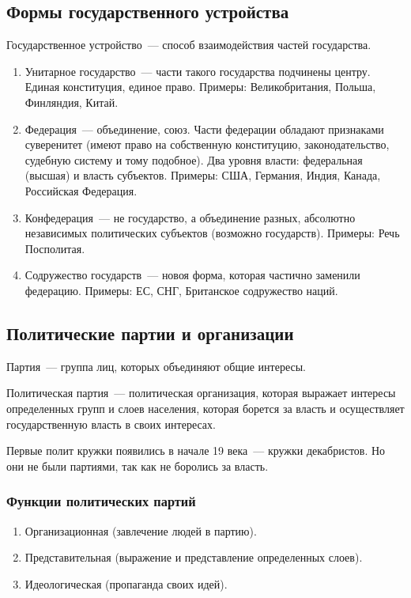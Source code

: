\documentclass[12pt]{article}
\begin{document}
	\subsection{Формы государственного устройства}
	\begin{definition}
		Государственное устройство~--- способ взаимодействия частей государства.
	\end{definition}
	\begin{enumerate}
		\item Унитарное государство~--- части такого государства подчинены центру. Единая конституция, единое право. Примеры: Великобритания, Польша, Финляндия, Китай.
		\item Федерация~--- объединение, союз. Части федерации обладают признаками суверенитет (имеют право на собственную конституцию, законодательство, судебную систему и тому подобное). Два уровня власти: федеральная (высшая) и власть субъектов. Примеры: США, Германия, Индия, Канада, Российская Федерация.
		\item Конфедерация~--- не государство, а объединение разных, абсолютно независимых политических субъектов (возможно государств). Примеры: Речь Посполитая.
		\item Содружество государств~--- новоя форма, которая частично заменили федерацию. Примеры: ЕС, СНГ, Британское содружество наций.
	\end{enumerate}
	\subsection{Политические партии и организации}
	\begin{definition}
		Партия~--- группа лиц, которых объединяют общие интересы.
	\end{definition}
	\begin{definition}
		Политическая партия~--- политическая организация, которая выражает интересы определенных групп и слоев населения, которая борется за власть и осуществляет государственную власть в своих интересах.
	\end{definition}
	\begin{note}
		Первые полит кружки появились в начале 19 века~--- кружки декабристов. Но они не были партиями, так как не боролись за власть.
	\end{note}
	\subsubsection{Функции политических партий}
	\begin{enumerate}
		\item Организационная (завлечение людей в партию).
		\item Представительная (выражение и представление определенных слоев).
		\item Идеологическая (пропаганда своих идей).
	\end{enumerate}
\end{document}
